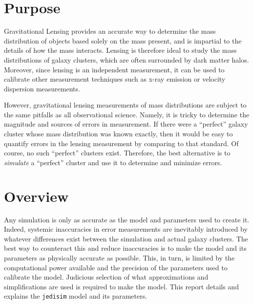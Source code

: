 \documentclass[10pt,twoside]{article}
\theoremstyle{definition}
\theoremstyle{exercise}
\begin{document}
\section{Purpose}

  Gravitational Lensing provides an accurate way to determine the mass distribution of objects based solely on the mass present, and is impartial to the details of how the mass interacts. Lensing is therefore ideal to study the mass distributions of galaxy clusters, which are often surrounded by dark matter halos. Moreover, since lensing is an independent measurement, it can be used to calibrate other measurement techniques such as x-ray emission or velocity dispersion measurements.  

  However, gravitational lensing measurements of mass distributions are subject to the same pitfalls as all observational science. Namely, it is tricky to determine the magnitude and sources of errors in measurement. If there were a ``perfect'' galaxy cluster whose mass distribution was known exactly, then it would be easy to quantify errors in the lensing measurement by comparing to that standard. Of course, no such ``perfect'' clusters exist. Therefore, the best alternative is to \textit{simulate} a ``perfect'' cluster and use it to determine and minimize errors.



\section{Overview}
Any simulation is only as accurate as the model and parameters used to create it. Indeed, systemic inaccuracies in error measurements are inevitably introduced by whatever differences exist between the simulation and actual galaxy clusters. The best way to counteract this and reduce inaccuracies is to make the model and its parameters as physically accurate as possible. This, in turn, is limited by the computational power available and the precision of the parameters used to calibrate the model. Judicious selection of what approximations and simplifications are used is required to make the model. This report details and explains the \texttt{jedisim} model and its parameters.
\end{document}
